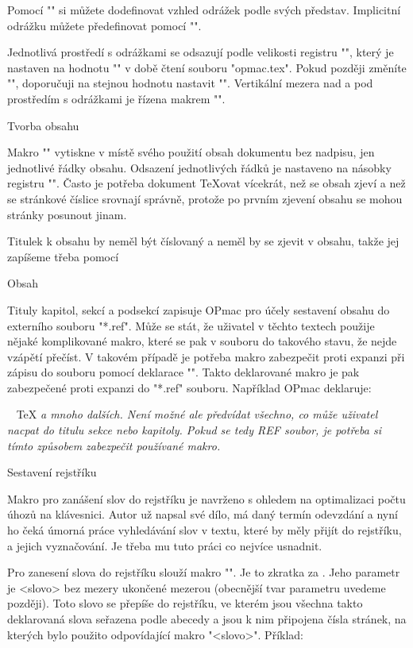 Pomocí "" si můžete dodefinovat vzhled odrážek
podle svých představ. Implicitní odrážku můžete předefinovat pomocí
"\def\normalitem{<text>}".

Jednotlivá prostředí s odrážkami se odsazují podle
velikosti registru "\iindent", který je nastaven na hodnotu "\parindent" v
době čtení souboru "opmac.tex". Pokud později změníte "\parindent",
doporučuji na stejnou hodnotu nastavit "\iindent".
Vertikální mezera nad a pod prostředím s odrážkami je řízena makrem
"\iiskip".

\sec Tvorba obsahu

Makro "\maketoc" vytiskne v místě svého použití obsah dokumentu bez nadpisu,
jen jednotlivé řádky obsahu. Odsazení jednotlivých řádků je nastaveno na
násobky registru "\iindent". Často je potřeba dokument \TeX{}ovat vícekrát,
než se obsah zjeví a než se stránkové číslice srovnají správně, protože po
prvním zjevení obsahu se mohou stránky posunout jinam.

Titulek k obsahu by neměl být číslovaný a neměl by se zjevit v obsahu, takže
jej zapíšeme třeba pomocí

\begtt
\nonum\notoc\sec Obsah
\endtt

Tituly kapitol, sekcí a podsekcí zapisuje OPmac pro účely sestavení obsahu do
externího souboru "*.ref". Může se stát, že uživatel v těchto textech
použije nějaké komplikované makro, které se pak v souboru  do
takového stavu, že nejde vzápětí přečíst. V takovém případě je potřeba
makro zabezpečit proti expanzi při zápisu do souboru pomocí
deklarace "\addprotect\makro". Takto deklarované makro je pak zabezpečené
proti expanzi do "*.ref" souboru. Například OPmac deklaruje:

\begtt
\addprotect~ \addprotect\TeX \addprotect\thefontsize \addprotect\em
\endtt 
%
a mnoho dalších. Není možné ale předvídat všechno, co může uživatel
nacpat do titulu sekce nebo kapitoly. Pokud se tedy 
REF soubor, je potřeba si tímto způsobem zabezpečit používané makro.


\sec Sestavení rejstříku

Makro pro zanášení slov do rejstříku je navrženo s ohledem na optimalizaci
počtu úhozů na klávesnici. Autor už napsal své dílo, má daný termín
odevzdání a nyní ho čeká úmorná práce vyhledávání slov v textu, které by
měly přijít do rejstříku, a jejich vyznačování. Je třeba mu tuto práci co
nejvíce usnadnit.

Pro zanesení slova do rejstříku slouží makro "\ii". Je to zkratka za
.
Jeho parametr je <slovo> bez mezery ukončené mezerou (obecnější tvar parametru
uvedeme později). Toto slovo se přepíše do rejstříku, ve kterém jsou všechna
takto deklarovaná slova seřazena podle abecedy a jsou k nim připojena čísla
stránek, na kterých bylo použito odpovídající makro "\ii <slovo>". 
Příklad:


